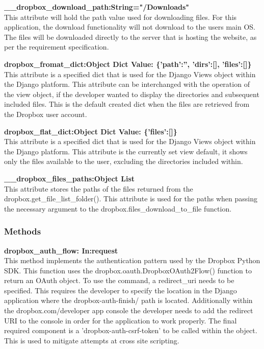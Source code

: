 \textbf{\_\_dropbox\_download\_path:String="/Downloads"} \\
    This attribute will hold the path value used for downloading files. For this application, the download functionality will not download to the users
    main OS. The files will be downloaded directly to the server that is hosting the website, as per the requirement specification. 

\textbf{dropbox\_fromat\_dict:Object Dict Value: \{'path':'', 'dirs':[], 'files':[]\}} \\
    This attribute is a specified dict that is used for the Django Views object within the Django platform. This attribute can be interchanged
    with the operation of the view object, if the developer wanted to display the directories and subsequent included files. This is the default 
    created dict when the files are retrieved from the Dropbox user account.

\textbf{dropbox\_flat\_dict:Object Dict Value: \{'files':[]\}} \\
    This attribute is a specified dict that is used for the Django Views object within the Django platform. This attribute is the currently set 
    view default, it shows only the files available to the user, excluding the directories included within. 

\textbf{\_\_dropbox\_files\_paths:Object List} \\
    This attribute stores the paths of the files returned from the dropbox.get\_file\_list\_folder(). This attribute is used for the paths when 
    passing the necessary argument to the dropbox.files\_download\_to\_file function. 

\subsubsection{Methods}
\textbf{dropbox\_auth\_flow: In:request} \\
    This method implements the authentication pattern used by the Dropbox Python SDK. This function uses the dropbox.oauth.DropboxOAuth2Flow() 
    function to return an OAuth object. To use the command, a redirect\_uri needs to be specified. This requires the developer to specify the 
    location in the Django application where the dropbox-auth-finish/ path is located. Additionally within the dropbox.com/developer app console
    the developer needs to add the redirect URI to the console in order for the application to work properly. The final required component is a 
    'dropbox-auth-csrf-token' to be called within the object. This is used to mitigate attempts at cross site scripting.

